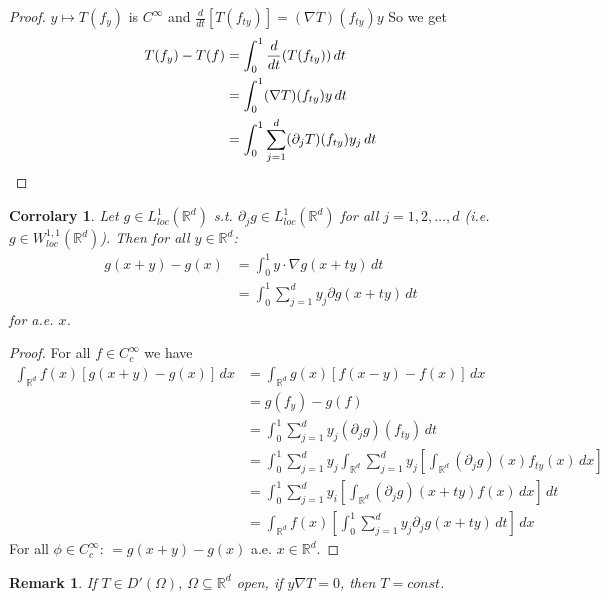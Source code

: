 \documentclass{report}
\theoremstyle{tommy}
\newtheorem{cor}[defn]{Corrolary}
\newtheorem{rem}[defn]{Remark}
\begin{document}
  \begin{proof}
    \(y \mapsto T(f_y)\) is \(C^\infty\) and \(\frac{d}{dt} [T(f_{ty})] = (\nabla T)(f_{ty}) y\) So we get
    \begin{align*}
      T(f_y) - T(f) 
      &= \int_0^1 \frac{d}{dt}(T(f_{ty})) \, dt \\
      &= \int_0^1 (\nabla T)(f_{ty}) y \, dt \\
      &= \int_0^1 \sum_{j=1}^d (\partial_j T)(f_{ty}) y_j \, dt \qedhere
    \end{align*}
  \end{proof}
  
  \begin{cor}
    Let \(g \in L_{loc}^1(\mathbb{R}^d)\) s.t. \(\partial_j g\in L_{loc}^1(\mathbb{R}^d)\) for all \(j = 1, 2, \dots, d\) (i.e. \(g \in W_{loc}^{1,1}(\mathbb{R}^d)\)). Then for all \(y \in \mathbb{R}^d\):
    \begin{align*}
      g(x+y) - g(x) &= \int_0^1 y \cdot \nabla g(x + ty) \, dt \\
      &= \int_0^1 \sum_{j=1}^d y_j \partial g(x+ty) \, dt
    \end{align*}
    for a.e. \(x\).
  \end{cor}

  \begin{proof}
    For all \(f \in C_c^\infty\) we have 
    \begin{align*}
      \int_{\mathbb{R}^d} f(x) [g(x+y) - g(x)] \, dx
      &= \int_{\mathbb{R}^d} g(x) [f(x-y) - f(x)] \, dx \\
      &= g(f_y) - g(f) \\
      &= \int_0^1 \sum_{j=1}^d y_j (\partial_j g)(f_{ty}) \, dt \\
      &= \int_0^1 \sum_{j=1}^d y_j \int_{\mathbb{R}^d} \sum_{j=1}^d y_j \left[\int_{\mathbb{R}^d} (\partial_j g)(x) f_{ty}(x) \, dx\right] \\
      &= \int_0^1 \sum_{j=1}^d y_i \left[\int_{\mathbb{R}^d}(\partial_j g)(x+ty) f(x) \, dx\right] \, dt \\
      &= \int_{\mathbb{R}^d} f(x) \left[\int_0^1 \sum_{j=1}^d y_j \partial_j g(x+ty) \, dt \right] \, dx
    \end{align*}
    For all \(\phi \in C_c^\infty\): \( = g(x+y) - g(x)\) a.e. \(x \in \mathbb{R}^d\).
  \end{proof}

  \begin{rem}
    If \(T \in D'(\Omega)\), \(\Omega \subseteq \mathbb{R}^d\) open, if \(y \nabla T = 0\), then \(T = const\).
  \end{rem}
\end{document}
